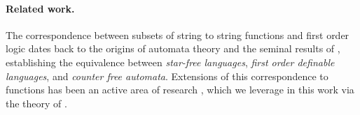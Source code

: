\paragraph{Related work.} The correspondence between subsets of string to
string functions and first order logic dates back to the origins of automata
theory and the seminal results of \cite{PEPI86,SCHU65,MNPA71}, establishing the
equivalence between \emph{star-free languages}, \emph{first order definable
languages}, and \emph{counter free automata}. Extensions of this correspondence
to functions has been an active area of research \cite{CADA15,MUSC19}, which
we leverage in this work via the theory of 
\cite{ENMA02,bojanczyk2018polyregular,bojanczyk2019string,bojanczyk2023growth}.

